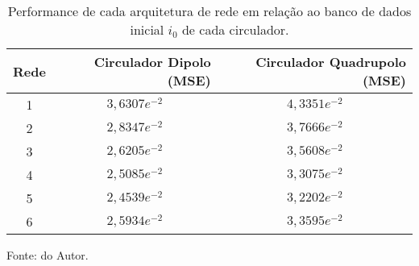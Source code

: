 



\begin{table}[H]
    \centering
    \caption{Performance de cada arquitetura de rede em relação ao banco de dados inicial $i_{0}$ de cada circulador.}
    \begin{tabular}{ccc}
\hline
Rede & \multicolumn{1}{r}{Circulador Dipolo (MSE)} & \multicolumn{1}{r}{Circulador Quadrupolo (MSE)} \\ \hline
1    & $3,6307e^{-2}$                              & $4,3351e^{-2}$                                  \\
2    & $2,8347e^{-2}$                   	       & $3,7666e^{-2}$                                  \\
3    & $2,6205e^{-2}$                              & $3,5608e^{-2}$                                  \\
4    & $2,5085e^{-2}$                              & $3,3075e^{-2}$                                  \\
5    & $2,4539e^{-2}$                              & $3,2202e^{-2}$                                  \\
6    & $2,5934e^{-2}$                              & $3,3595e^{-2}$                                  \\ \hline
\end{tabular}

    \label{tab: ArquiteturaRedeCirculador}

    \vspace{2.5mm}
    Fonte: do Autor.

    \end{table}